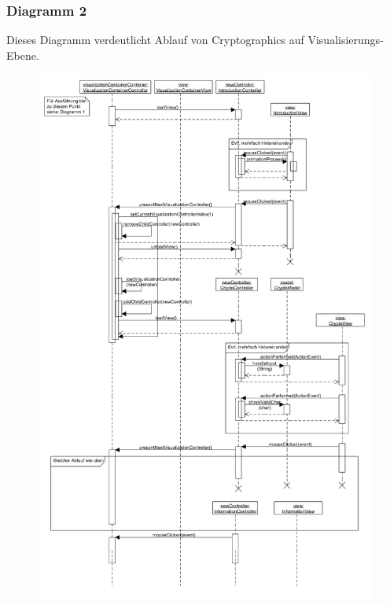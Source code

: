 \documentclass{article}
\begin{document}
\subsubsection{Diagramm 2}
	Dieses Diagramm verdeutlicht Ablauf von Cryptographics auf Visualisierungs-Ebene.
	\begin{figure}[H]
        \centering
        \includegraphics[height=0.9\textheight]{resources/sequenceDiagram02}
      \end{figure}

\restoregeometry

\glsaddall
\printglossary[numberedsection, style=altlist]
\end{document}
